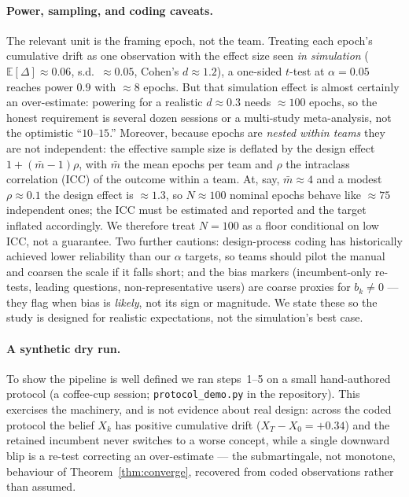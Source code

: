 \documentclass[11pt]{article}
\newcommand{\E}{\mathbb{E}}
\begin{document}
\paragraph{Power, sampling, and coding caveats.} The relevant unit is the framing epoch, not the team. Treating each epoch's cumulative drift as one observation with the effect size seen \emph{in simulation} ($\E[\Delta]\approx0.06$, s.d.\ $\approx0.05$, Cohen's $d\approx1.2$), a one-sided $t$-test at $\alpha=0.05$ reaches power $0.9$ with $\approx8$ epochs. But that simulation effect is almost certainly an over-estimate: powering for a realistic $d\approx0.3$ needs $\approx100$ epochs, so the honest requirement is several dozen sessions or a multi-study meta-analysis, not the optimistic ``$10$--$15$.'' Moreover, because epochs are \emph{nested within teams} they are not independent: the effective sample size is deflated by the design effect $1+(\bar m-1)\rho$, with $\bar m$ the mean epochs per team and $\rho$ the intraclass correlation (ICC) of the outcome within a team. At, say, $\bar m\approx4$ and a modest $\rho\approx0.1$ the design effect is $\approx1.3$, so $N\approx100$ nominal epochs behave like $\approx75$ independent ones; the ICC must be estimated and reported and the target inflated accordingly. We therefore treat $N=100$ as a floor conditional on low ICC, not a guarantee. Two further cautions: design-process coding has historically achieved lower reliability than our $\alpha$ targets, so teams should pilot the manual and coarsen the scale if it falls short; and the bias markers (incumbent-only re-tests, leading questions, non-representative users) are coarse proxies for $b_k\neq0$ --- they flag when bias is \emph{likely}, not its sign or magnitude. We state these so the study is designed for realistic expectations, not the simulation's best case.

\paragraph{A synthetic dry run.} To show the pipeline is well defined we ran steps~1--5 on a small hand-authored protocol (a coffee-cup session; \texttt{protocol\_demo.py} in the repository). This exercises the machinery, and is not evidence about real design: across the coded protocol the belief $X_k$ has positive cumulative drift ($X_T-X_0=+0.34$) and the retained incumbent never switches to a worse concept, while a single downward blip is a re-test correcting an over-estimate --- the submartingale, not monotone, behaviour of Theorem~\ref{thm:converge}, recovered from coded observations rather than assumed.
\end{document}
